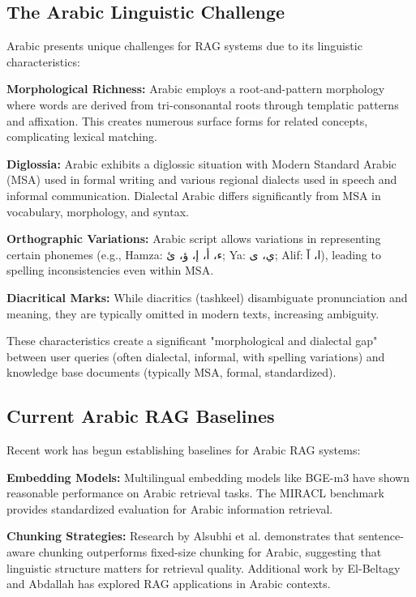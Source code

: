 \subsection{The Arabic Linguistic Challenge}

Arabic presents unique challenges for RAG systems due to its linguistic characteristics:

\textbf{Morphological Richness:} Arabic employs a root-and-pattern morphology where words are derived from tri-consonantal roots through templatic patterns and affixation. This creates numerous surface forms for related concepts, complicating lexical matching.

\textbf{Diglossia:} Arabic exhibits a diglossic situation with Modern Standard Arabic (MSA) used in formal writing and various regional dialects used in speech and informal communication. Dialectal Arabic differs significantly from MSA in vocabulary, morphology, and syntax.

\textbf{Orthographic Variations:} Arabic script allows variations in representing certain phonemes (e.g., Hamza: ء، أ، إ، ؤ، ئ; Ya: ي، ى; Alif: ا، آ), leading to spelling inconsistencies even within MSA.

\textbf{Diacritical Marks:} While diacritics (tashkeel) disambiguate pronunciation and meaning, they are typically omitted in modern texts, increasing ambiguity.

These characteristics create a significant "morphological and dialectal gap" between user queries (often dialectal, informal, with spelling variations) and knowledge base documents (typically MSA, formal, standardized).

\subsection{Current Arabic RAG Baselines}

Recent work has begun establishing baselines for Arabic RAG systems:

\textbf{Embedding Models:} Multilingual embedding models like BGE-m3 have shown reasonable performance on Arabic retrieval tasks. The MIRACL benchmark \cite{zhang_2023_miracl} provides standardized evaluation for Arabic information retrieval.

\textbf{Chunking Strategies:} Research by Alsubhi et al. \cite{alsubhi_2025_optimizing} demonstrates that sentence-aware chunking outperforms fixed-size chunking for Arabic, suggesting that linguistic structure matters for retrieval quality. Additional work by El-Beltagy and Abdallah \cite{elbeltagysamhaar_2024_exploring} has explored RAG applications in Arabic contexts.


